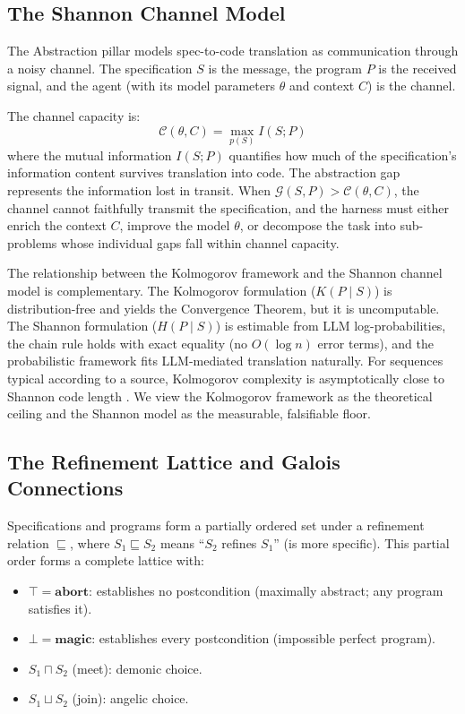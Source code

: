 \documentclass[11pt, a4paper, logo, copyright]{googledeepmind}
\begin{document}
\subsection{The Shannon Channel Model}

The Abstraction pillar models spec-to-code translation as communication through a noisy channel. The specification $S$ is the message, the program $P$ is the received signal, and the agent (with its model parameters $\theta$ and context $C$) is the channel.

The channel capacity is:
\begin{equation}
    \mathcal{C}(\theta, C) = \max_{p(S)} I(S; P)
\end{equation}
where the mutual information $I(S; P)$ quantifies how much of the specification's information content survives translation into code. The abstraction gap represents the information lost in transit. When $\mathcal{G}(S, P) > \mathcal{C}(\theta, C)$, the channel cannot faithfully transmit the specification, and the harness must either enrich the context $C$, improve the model $\theta$, or decompose the task into sub-problems whose individual gaps fall within channel capacity.

The relationship between the Kolmogorov framework and the Shannon channel model is complementary. The Kolmogorov formulation ($K(P \mid S)$) is distribution-free and yields the Convergence Theorem, but it is uncomputable. The Shannon formulation ($H(P \mid S)$) is estimable from LLM log-probabilities, the chain rule holds with exact equality (no $O(\log n)$ error terms), and the probabilistic framework fits LLM-mediated translation naturally. For sequences typical according to a source, Kolmogorov complexity is asymptotically close to Shannon code length \citep{vitanyi2004shannon}. We view the Kolmogorov framework as the theoretical ceiling and the Shannon model as the measurable, falsifiable floor.

\subsection{The Refinement Lattice and Galois Connections}

Specifications and programs form a partially ordered set under a refinement relation $\sqsubseteq$, where $S_1 \sqsubseteq S_2$ means ``$S_2$ refines $S_1$'' (is more specific). This partial order forms a complete lattice \citep{back1980correctness, morgan1994programming} with:

\begin{itemize}[nosep]
    \item $\top = \mathbf{abort}$: establishes no postcondition (maximally abstract; any program satisfies it).
    \item $\bot = \mathbf{magic}$: establishes every postcondition (impossible perfect program).
    \item $S_1 \sqcap S_2$ (meet): demonic choice.
    \item $S_1 \sqcup S_2$ (join): angelic choice.
\end{itemize}
\end{document}
